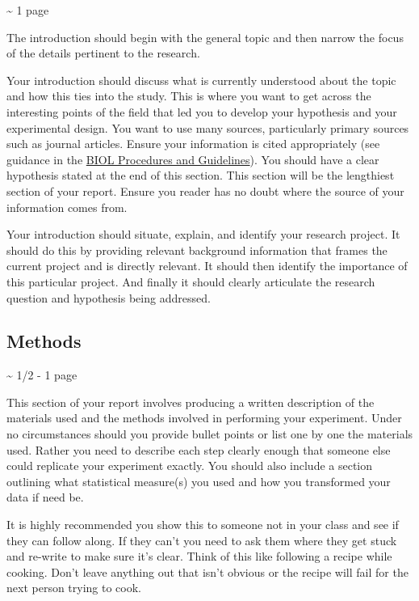 \documentclass[
]{book}
\begin{document}
\textasciitilde{} 1 page

The introduction should begin with the general topic and then narrow the focus of the details pertinent to the research.

Your introduction should discuss what is currently understood about the topic and how this ties into the study. This is where you want to get across the interesting points of the field that led you to develop your hypothesis and your experimental design. You want to use many sources, particularly primary sources such as journal articles. Ensure your information is cited appropriately (see guidance in the \href{https://ubco-biology.github.io/Procedures-and-Guidelines/apa-citations.html}{BIOL Procedures and Guidelines}). You should have a clear hypothesis stated at the end of this section. This section will be the lengthiest section of your report. Ensure you reader has no doubt where the source of your information comes from.

Your introduction should situate, explain, and identify your research project. It should do this by providing relevant background information that frames the current project and is directly relevant. It should then identify the importance of this particular project. And finally it should clearly articulate the research question and hypothesis being addressed.

\hypertarget{methods}{%
\subsection*{Methods}\label{methods}}

\textasciitilde{} 1/2 - 1 page

This section of your report involves producing a written description of the materials used and the methods involved in performing your experiment. Under no circumstances should you provide bullet points or list one by one the materials used. Rather you need to describe each step clearly enough that someone else could replicate your experiment exactly. You should also include a section outlining what statistical measure(s) you used and how you transformed your data if need be.

It is highly recommended you show this to someone not in your class and see if they can follow along. If they can't you need to ask them where they get stuck and re-write to make sure it's clear. Think of this like following a recipe while cooking. Don't leave anything out that isn't obvious or the recipe will fail for the next person trying to cook.
\end{document}
